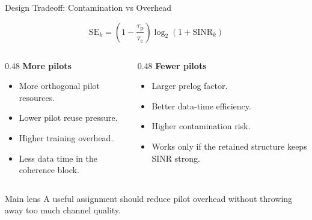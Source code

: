 \documentclass[10pt,aspectratio=169]{beamer}
\newcommand{\taup}{\tau_{\mathrm{p}}}
\newcommand{\tauc}{\tau_{\mathrm{c}}}
\newcommand{\se}{\mathrm{SE}}
\newenvironment{tightitemize}{%
    \begin{itemize}
        \setlength{\itemsep}{1pt}
        \setlength{\parskip}{0pt}
        \setlength{\parsep}{0pt}
}{%
    \end{itemize}
}
\begin{document}
\begin{frame}{Design Tradeoff: Contamination vs Overhead}
    \small
    \begin{center}
        \large
        \[
            \se_k =
            \left(1 - \frac{\taup}{\tauc}\right)
            \log_2\!\left(1+\mathrm{SINR}_k\right)
        \]
    \end{center}

    \vspace{0.4em}
    \begin{columns}[T,onlytextwidth]
        \begin{column}{0.48\textwidth}
            \textbf{More pilots}
            \begin{tightitemize}
                \item More orthogonal pilot resources.
                \item Lower pilot reuse pressure.
                \item Higher training overhead.
                \item Less data time in the coherence block.
            \end{tightitemize}
        \end{column}
        \begin{column}{0.48\textwidth}
            \textbf{Fewer pilots}
            \begin{tightitemize}
                \item Larger prelog factor.
                \item Better data-time efficiency.
                \item Higher contamination risk.
                \item Works only if the retained structure keeps SINR strong.
            \end{tightitemize}
        \end{column}
    \end{columns}

    \vspace{0.8em}
    \begin{block}{Main lens}
        A useful assignment should reduce pilot overhead without throwing away too much channel quality.
    \end{block}
\end{frame}
\end{document}
